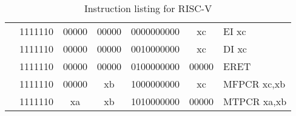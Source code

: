 \begin{table}[p]
\begin{small}
\begin{center}
\begin{tabular}{rcccccccccl}
&
\multicolumn{2}{|c|}{1111110} &
\multicolumn{1}{c|}{00000} &
\multicolumn{1}{c|}{00000} &
\multicolumn{4}{c|}{0000000000} &
\multicolumn{1}{c|}{xc} & EI xc \\
\cline{2-10}
  

&
\multicolumn{2}{|c|}{1111110} &
\multicolumn{1}{c|}{00000} &
\multicolumn{1}{c|}{00000} &
\multicolumn{4}{c|}{0010000000} &
\multicolumn{1}{c|}{xc} & DI xc \\
\cline{2-10}
  

&
\multicolumn{2}{|c|}{1111110} &
\multicolumn{1}{c|}{00000} &
\multicolumn{1}{c|}{00000} &
\multicolumn{4}{c|}{0100000000} &
\multicolumn{1}{c|}{00000} & ERET  \\
\cline{2-10}
  

&
\multicolumn{2}{|c|}{1111110} &
\multicolumn{1}{c|}{00000} &
\multicolumn{1}{c|}{xb} &
\multicolumn{4}{c|}{1000000000} &
\multicolumn{1}{c|}{xc} & MFPCR xc,xb \\
\cline{2-10}
  

&
\multicolumn{2}{|c|}{1111110} &
\multicolumn{1}{c|}{xa} &
\multicolumn{1}{c|}{xb} &
\multicolumn{4}{c|}{1010000000} &
\multicolumn{1}{c|}{00000} & MTPCR xa,xb \\
\cline{2-10}
  

\end{tabular}
\end{center}
\end{small}
\caption{Instruction listing for RISC-V}
\label{instr-table}
\end{table}
  

